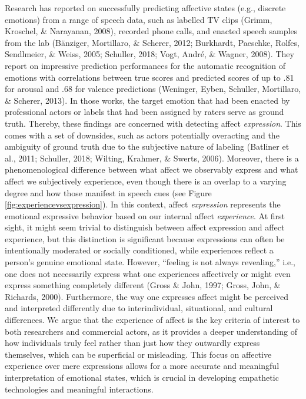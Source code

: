 \documentclass[
  english,
  man,floatsintext]{apa6}
\begin{document}
Research has reported on successfully predicting affective states (e.g., discrete emotions) from a range of speech data, such as labelled TV clips (Grimm, Kroschel, \& Narayanan, 2008), recorded phone calls, and enacted speech samples from the lab (Bänziger, Mortillaro, \& Scherer, 2012; Burkhardt, Paeschke, Rolfes, Sendlmeier, \& Weiss, 2005; Schuller, 2018; Vogt, André, \& Wagner, 2008). They report on impressive prediction performances for the automatic recognition of emotions with correlations between true scores and predicted scores of up to .81 for arousal and .68 for valence predictions (Weninger, Eyben, Schuller, Mortillaro, \& Scherer, 2013). In those works, the target emotion that had been enacted by professional actors or labels that had been assigned by raters serve as ground truth. Thereby, these findings are concerned with detecting affect \emph{expression}. This comes with a set of downsides, such as actors potentially overacting and the ambiguity of ground truth due to the subjective nature of labeling (Batliner et al., 2011; Schuller, 2018; Wilting, Krahmer, \& Swerts, 2006). Moreover, there is a phenomenological difference between what affect we observably express and what affect we subjectively experience, even though there is an overlap to a varying degree and how those manifest in speech cues (see Figure \ref{fig:experiencevsexpression}). In this context, affect \emph{expression} represents the emotional expressive behavior based on our internal affect \emph{experience}. At first sight, it might seem trivial to distinguish between affect expression and affect experience, but this distinction is significant because expressions can often be intentionally moderated or socially conditioned, while experiences reflect a person's genuine emotional state. However, ``feeling is not always revealing,'' i.e., one does not necessarily express what one experiences affectively or might even express something completely different (Gross \& John, 1997; Gross, John, \& Richards, 2000). Furthermore, the way one expresses affect might be perceived and interpreted differently due to interindividual, situational, and cultural differences. We argue that the experience of affect is the key criteria of interest to both researchers and commercial actors, as it provides a deeper understanding of how individuals truly feel rather than just how they outwardly express themselves, which can be superficial or misleading. This focus on affective experience over mere expressions allows for a more accurate and meaningful interpretation of emotional states, which is crucial in developing empathetic technologies and meaningful interactions.
\end{document}
